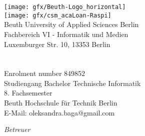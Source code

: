 \begin{titlepage}
	\tgherosfont
	\centering

	\texttt{[image: gfx/Beuth-Logo\_horizontal]} \\[12mm]
	\texttt{[image: gfx/csm\_acaLoan-Raspi]} \\[0mm]

    {\normalsize Beuth University of Applied Sciences Berlin}\\
    {\normalsize Fachbereich VI - Informatik und Medien}\\
    {\normalsize Luxemburger Str. 10, 13353 Berlin}\\[5mm]
	\vfill
	{\LARGE \color{ctcolortitle}\textbf{\thesisTitle}}\\[10mm]
	
	{\LARGE \thesisName} \\[5mm]
    {\normalsize Enrolment number 849852} \\
	{\normalsize Studiengang Bachelor Technische Informatik} \\
    {\normalsize 8. Fachsemester} \\
    {\normalsize Beuth Hochschule für Technik Berlin} \\[5mm]
	{\small E-Mail: oleksandra.baga@gmail.com} \\

	\vfill
	\begin{minipage}[t]{.27\textwidth}
		\raggedleft
		\textit{Betreuer}
	\end{minipage}
	\hspace*{15pt}
	\begin{minipage}[t]{.65\textwidth}
		{\large \thesisFirstReviewer} \\
	  	{\small \thesisFirstReviewerDepartment} \\[-1mm]
		{\small \thesisFirstReviewerUniversity}
	\end{minipage} \\[5mm]
	\begin{minipage}[t]{.27\textwidth}
		\raggedleft
		\textit{ }
	\end{minipage}
	\hspace*{15pt}
	\begin{minipage}[t]{.65\textwidth}
		{\large \thesisSecondReviewer} \\
	  	{\small \thesisSecondReviewerDepartment} \\[-1mm]
		{\small \thesisSecondReviewerUniversity}
	\end{minipage} \\[10mm]
	\thesisDate \\
\end{titlepage}